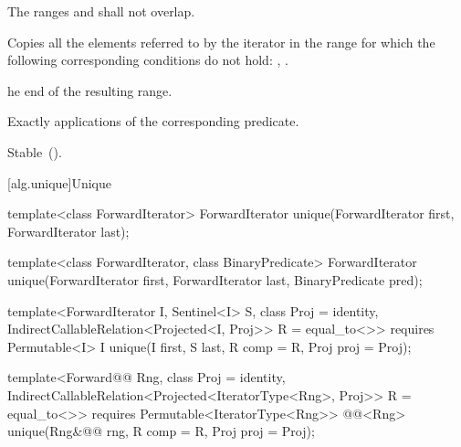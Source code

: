 \begin{itemdescr}
\pnum
\requires
The ranges
and
shall not overlap.

\pnum
\effects
Copies all the elements referred to by the iterator
in the range
for which the following corresponding conditions do not hold:
,
.

\pnum
\returns
{}he end of the resulting range.

\pnum
\complexity
Exactly
applications of the corresponding predicate.

\pnum
\remarks Stable~().
\end{itemdescr}

[alg.unique]{Unique}

%
\begin{removedblock}
\begin{itemdecl}
template<class ForwardIterator>
  ForwardIterator unique(ForwardIterator first, ForwardIterator last);

template<class ForwardIterator, class BinaryPredicate>
  ForwardIterator unique(ForwardIterator first, ForwardIterator last,
                         BinaryPredicate pred);
\end{itemdecl}
\end{removedblock}
\begin{addedblock}
\begin{itemdecl}
template<ForwardIterator I, Sentinel<I> S, class Proj = identity,
    IndirectCallableRelation<Projected<I, Proj>> R = equal_to<>>
  requires Permutable<I>
  I unique(I first, S last, R comp = R{}, Proj proj = Proj{});

template<Forward@@ Rng, class Proj = identity,
    IndirectCallableRelation<Projected<IteratorType<Rng>, Proj>> R = equal_to<>>
  requires Permutable<IteratorType<Rng>>
  @@<Rng>
    unique(Rng&@\newtxt{\&}@ rng, R comp = R{}, Proj proj = Proj{});
\end{itemdecl}
\end{addedblock}

